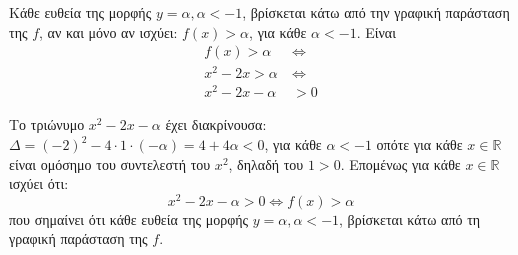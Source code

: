 \begin{alist}
\item Κάθε ευθεία της μορφής $y = \alpha, \alpha < -1$, βρίσκεται κάτω από την γραφική παράσταση της $f$, αν και μόνο αν ισχύει: $f(x) > \alpha$, για κάθε $\alpha < -1$. Είναι
\begin{align*}
f(x) > \alpha \ &\Leftrightarrow \\
x^2 - 2x > \alpha \ &\Leftrightarrow \\
x^2 - 2x - \alpha &> 0
\end{align*}

Το τριώνυμο $x^2 - 2x - \alpha$ έχει διακρίνουσα:
$\Delta = (-2)^2 - 4 \cdot 1 \cdot (-\alpha) = 4 + 4\alpha < 0$, για κάθε $\alpha < -1$
οπότε για κάθε $x \in \mathbb{R}$ είναι ομόσημο του συντελεστή του $x^2$, δηλαδή του $1 > 0$.
Επομένως για κάθε $x \in \mathbb{R}$ ισχύει ότι:
\[x^2 - 2x - \alpha > 0 \Leftrightarrow f(x) > \alpha\]
που σημαίνει ότι κάθε ευθεία της μορφής $y = \alpha, \alpha < -1$, βρίσκεται κάτω από τη γραφική παράσταση της $f$.
\end{alist}

